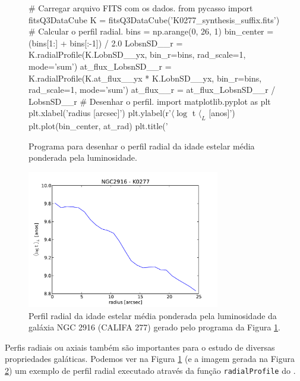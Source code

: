\begin{figure}
	\begin{python}
# Carregar arquivo FITS com os dados.
from pycasso import fitsQ3DataCube
K = fitsQ3DataCube('K0277_synthesis_suffix.fits')
# Calcular o perfil radial.
bins = np.arange(0, 26, 1)
bin_center = (bins[1:] + bins[:-1]) / 2.0
LobsnSD__r = K.radialProfile(K.LobnSD__yx, bin_r=bins, 
							 rad_scale=1, mode='sum')
at_flux_LobsnSD__r = K.radialProfile(K.at_flux__yx * K.LobnSD__yx, 
									 bin_r=bins, rad_scale=1, 
									 mode='sum')
at_flux__r = at_flux_LobsnSD__r / LobsnSD__r 
# Desenhar o perfil.
import matplotlib.pyplot as plt
plt.xlabel('radius [arcsec]')
plt.ylabel(r'$\langle \log$ t $\langle_L$ [anos]')
plt.plot(bin_center, at_rad)
plt.title('%
	\end{python}
	\caption[Exemplo de programa para perfil radial.]
	{Programa para desenhar o perfil radial da idade estelar média ponderada pela
	luminosidade.}
	\label{fig:programaPerfRad}
\end{figure}

\begin{figure}
	\includegraphics[width=0.75\textwidth]{figuras/K0277-at_flux_radprof.pdf}
	\caption[Perfil radial da idade estelar média da galáxia NGC 2916 (CALIFA 277).]
	{Perfil radial da idade estelar média ponderada pela luminosidade da galáxia
	NGC 2916 (CALIFA 277) gerado pelo programa da Figura \ref{fig:programaPerfRad}.}
	\label{fig:perfRad}
\end{figure}

Perfis radiais ou axiais também são importantes para o estudo de diversas propriedades galáticas. Podemos ver na Figura
\ref{fig:programaPerfRad} (e a imagem gerada na Figura \ref{fig:perfRad}) um exemplo de perfil radial executado
através da função \texttt{radialProfile} do \pycasso.

